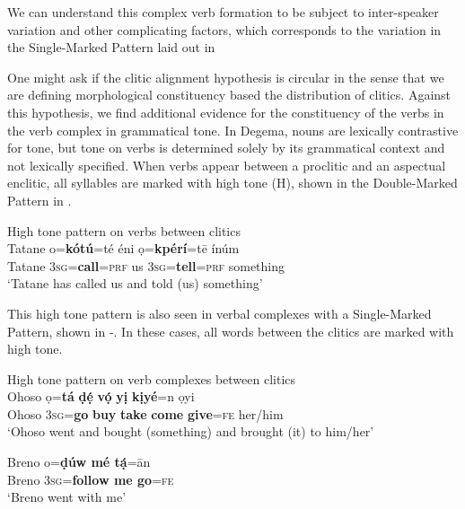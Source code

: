 \documentclass[output=paper]{langsci/langscibook}
\begin{document}
\z

We can understand this complex verb formation to be subject to inter-speaker variation and other complicating factors, which corresponds to the variation in the Single-Marked Pattern laid out in 

One might ask if the clitic alignment hypothesis is circular in the sense that we are defining morphological constituency based the distribution of clitics. Against this hypothesis, we find additional evidence for the constituency of the verbs in the verb complex in grammatical tone. In Degema, nouns are lexically contrastive for tone, but tone on verbs is determined solely by its grammatical context and not lexically specified. When verbs appear between a proclitic and an aspectual enclitic, all syllables are marked with high tone (H), shown in the Double-Marked Pattern in .

\ea\label{ex:rolle:49}
{High tone pattern on verbs between clitics}\\
\gll  Tatane  o=\textbf{kótú}=té     éni   ọ=\textbf{kpérí}=tē     ínúm\\
     Tatane  3\textsc{sg}=\textbf{call}=\textsc{prf}   us   3\textsc{sg}=\textbf{tell}=\textsc{prf}  something\\
\glt ‘Tatane has called us and told (us) something’ \citep[285]{Kari2003a} 
\z

This high tone pattern is also seen in verbal complexes with a Single-Marked Pattern, shown in -. In these cases, all words between the clitics are marked with high tone. 


\ea\label{50}
{High tone pattern on verb complexes between clitics} \\
\gll   Ohoso   ọ=\textbf{tá}  \textbf{ḍẹ́ } \textbf{vọ́  } \textbf{ yị } \textbf{kịyé}=n   ọyi\\
     Ohoso    \textsc{3sg}=\textbf{go}  \textbf{buy}  \textbf{take}  \textbf{come}  \textbf{give}=\textsc{fe}   her/him\\
\glt ‘Ohoso went and bought (something) and brought (it) to him/her’ \citep[121]{Kari2004}
\z

\ea\label{51}
\gll   Breno   o=\textbf{ḍúw    mé   tạ́}=ān\\
     Breno   3\textsc{sg}=\textbf{follow  me   go}=\textsc{fe}\\
\glt ‘Breno went with me’ \citep[115]{Kari2004}
\z
\end{document}
